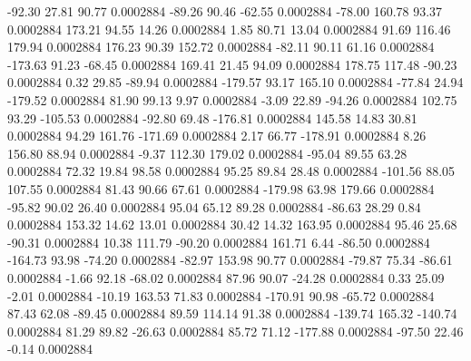       -92.30       27.81       90.77     0.0002884
      -89.26       90.46      -62.55     0.0002884
      -78.00      160.78       93.37     0.0002884
      173.21       94.55       14.26     0.0002884
        1.85       80.71       13.04     0.0002884
       91.69      116.46      179.94     0.0002884
      176.23       90.39      152.72     0.0002884
      -82.11       90.11       61.16     0.0002884
     -173.63       91.23      -68.45     0.0002884
      169.41       21.45       94.09     0.0002884
      178.75      117.48      -90.23     0.0002884
        0.32       29.85      -89.94     0.0002884
     -179.57       93.17      165.10     0.0002884
      -77.84       24.94     -179.52     0.0002884
       81.90       99.13        9.97     0.0002884
       -3.09       22.89      -94.26     0.0002884
      102.75       93.29     -105.53     0.0002884
      -92.80       69.48     -176.81     0.0002884
      145.58       14.83       30.81     0.0002884
       94.29      161.76     -171.69     0.0002884
        2.17       66.77     -178.91     0.0002884
        8.26      156.80       88.94     0.0002884
       -9.37      112.30      179.02     0.0002884
      -95.04       89.55       63.28     0.0002884
       72.32       19.84       98.58     0.0002884
       95.25       89.84       28.48     0.0002884
     -101.56       88.05      107.55     0.0002884
       81.43       90.66       67.61     0.0002884
     -179.98       63.98      179.66     0.0002884
      -95.82       90.02       26.40     0.0002884
       95.04       65.12       89.28     0.0002884
      -86.63       28.29        0.84     0.0002884
      153.32       14.62       13.01     0.0002884
       30.42       14.32      163.95     0.0002884
       95.46       25.68      -90.31     0.0002884
       10.38      111.79      -90.20     0.0002884
      161.71        6.44      -86.50     0.0002884
     -164.73       93.98      -74.20     0.0002884
      -82.97      153.98       90.77     0.0002884
      -79.87       75.34      -86.61     0.0002884
       -1.66       92.18      -68.02     0.0002884
       87.96       90.07      -24.28     0.0002884
        0.33       25.09       -2.01     0.0002884
      -10.19      163.53       71.83     0.0002884
     -170.91       90.98      -65.72     0.0002884
       87.43       62.08      -89.45     0.0002884
       89.59      114.14       91.38     0.0002884
     -139.74      165.32     -140.74     0.0002884
       81.29       89.82      -26.63     0.0002884
       85.72       71.12     -177.88     0.0002884
      -97.50       22.46       -0.14     0.0002884
